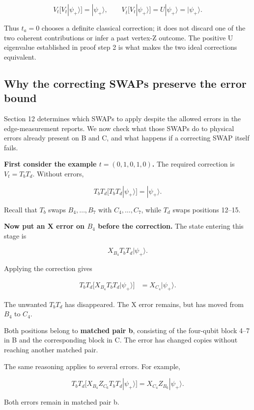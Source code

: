 \documentclass[11pt]{article}
\begin{document}
\[
V_t\bigl[V_t|\psi_+\rangle\bigr]=|\psi_+\rangle,\qquad
V_{\bar t}\bigl[V_t|\psi_+\rangle\bigr]=U|\psi_+\rangle=|\psi_+\rangle.
\]

Thus \(t_a=0\) chooses a definite classical correction; it does not discard one of the two coherent contributions or infer a past vertex-Z outcome. The positive U eigenvalue established in proof step 2 is what makes the two ideal corrections equivalent.

\subsection{Why the correcting SWAPs preserve the error bound}
Section 12 determines which SWAPs to apply despite the allowed errors in the edge-measurement reports. We now check what those SWAPs do to physical errors already present on B and C, and what happens if a correcting SWAP itself fails.

\textbf{First consider the example \(t=(0,1,0,1,0)\).} The required correction is \(V_t=T_bT_d\). Without errors,

\[
T_bT_d\bigl[T_bT_d|\psi_+\rangle\bigr]
=|\psi_+\rangle.
\]

Recall that \(T_b\) swaps \(B_4,\ldots,B_7\) with \(C_4,\ldots,C_7\), while \(T_d\) swaps positions 12--15.

\textbf{Now put an X error on \(B_4\) before the correction.} The state entering this stage is

\[
X_{B_4}T_bT_d|\psi_+\rangle.
\]

Applying the correction gives

\[
\begin{aligned}
T_bT_d\bigl[X_{B_4}T_bT_d|\psi_+\rangle\bigr]
&=X_{C_4}|\psi_+\rangle.
\end{aligned}
\]

The unwanted \(T_bT_d\) has disappeared. The X error remains, but has moved from \(B_4\) to \(C_4\).

Both positions belong to \textbf{matched pair b}, consisting of the four-qubit block 4--7 in B and the corresponding block in C. The error has changed copies without reaching another matched pair.

The same reasoning applies to several errors. For example,

\[
T_bT_d
\bigl[X_{B_4}Z_{C_6}T_bT_d|\psi_+\rangle\bigr]
=X_{C_4}Z_{B_6}|\psi_+\rangle.
\]

Both errors remain in matched pair b.
\end{document}
